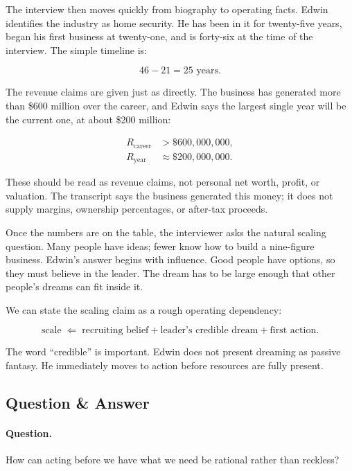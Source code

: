 The interview then moves quickly from biography to operating facts. Edwin identifies the industry as home security. He has been in it for twenty-five years, began his first business at twenty-one, and is forty-six at the time of the interview. The simple timeline is:

\begin{equation}
46-21=25\text{ years}.
\end{equation}

The revenue claims are given just as directly. The business has generated more than \$600 million over the career, and Edwin says the largest single year will be the current one, at about \$200 million:

\begin{align}
R_{\text{career}} &> \$600{,}000{,}000,\\
R_{\text{year}} &\approx \$200{,}000{,}000.
\end{align}

These should be read as revenue claims, not personal net worth, profit, or valuation. The transcript says the business generated this money; it does not supply margins, ownership percentages, or after-tax proceeds.

Once the numbers are on the table, the interviewer asks the natural scaling question. Many people have ideas; fewer know how to build a nine-figure business. Edwin's answer begins with influence. Good people have options, so they must believe in the leader. The dream has to be large enough that other people's dreams can fit inside it.

We can state the scaling claim as a rough operating dependency:

\begin{equation}
\text{scale}
\;\Longleftarrow\;
\text{recruiting belief}
+
\text{leader's credible dream}
+
\text{first action}.
\end{equation}

The word ``credible'' is important. Edwin does not present dreaming as passive fantasy. He immediately moves to action before resources are fully present.

\subsection{Question \& Answer}

\paragraph{Question.}
How can acting before we have what we need be rational rather than reckless?

